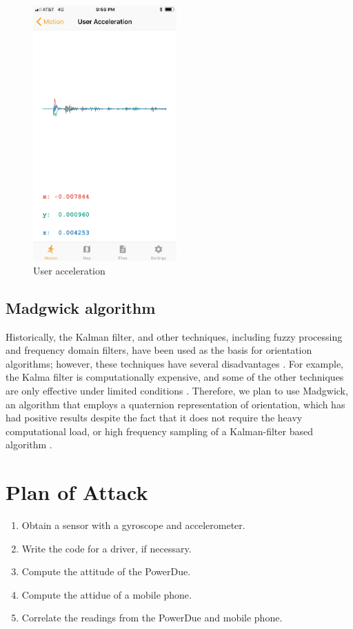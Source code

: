 \documentclass[journal]{IEEEtranTIE}
\begin{document}
\begin{enumerate}
\begin{enumerate}
\begin{figure}[!t]\centering
	\includegraphics[width=5.5cm]{acceleration}
	\caption{User acceleration}\label{fig2}
\end{figure}

\subsection{Madgwick algorithm}

Historically, the Kalman filter, and other techniques, including fuzzy
processing and frequency domain filters, have been used as the basis for
orientation algorithms; however, these techniques have several disadvantages
\cite{Madgwick}. For example, the Kalma filter is computationally expensive,
and some of the other techniques are only effective under limited conditions
\cite{Madgwick}. Therefore, we plan to use Madgwick, an algorithm
that employs a quaternion representation of orientation, which has had positive
results despite the fact that it does not require the heavy computational load,
or high frequency sampling of a Kalman-filter based algorithm \cite{Madgwick}.

\section{Plan of Attack}

\begin{enumerate}
\item Obtain a sensor with a gyroscope and accelerometer.
\item Write the code for a driver, if necessary.
\item Compute the attitude of the PowerDue.
\item Compute the attidue of a mobile phone.
\item Correlate the readings from the PowerDue and mobile phone.
\end{enumerate}


\end{enumerate}
\end{enumerate}
\end{document}
